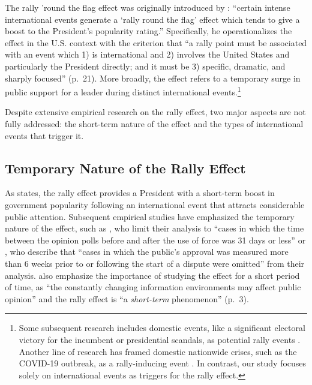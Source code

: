 \documentclass[letterpaper,12pt]{scrartcl}
\begin{document}
The rally 'round the flag effect was originally introduced by \citet[][p.~21]{Mueller1970APSR}: ``certain intense international events generate a `rally round the flag' effect which tends to give a boost to the President's popularity rating.'' Specifically, he operationalizes the effect in the U.S. context with the criterion that ``a rally point must be associated with an event which 1) is international and 2) involves the United States and particularly the President directly; and it must be 3) specific, dramatic, and sharply focused'' (p.~21).  More broadly, the effect refers to a temporary surge in public support for a leader during distinct international events.\footnote{Some subsequent research includes domestic events, like a significant electoral victory for the incumbent or presidential scandals, as potential rally events \citep[e.g.,][]{Newman2010ElectStud}. Another line of research has framed domestic nationwide crises, such as the COVID-19 outbreak, as a rally-inducing event \citep[e.g.,][]{Kritzinger2021WestEurPolit,Yam2020PNAS}. In contrast, our study focuses solely on international events as triggers for the rally effect.}

Despite extensive empirical research on the rally effect, two major aspects are not fully addressed: the short-term nature of the effect and the types of international events that trigger it.


\subsection*{Temporary Nature of the Rally Effect}

As \citet{Mueller1970APSR} states, the rally effect provides a President with a short-term boost in government popularity following an international event that attracts considerable public attention. Subsequent empirical studies have emphasized the temporary nature of the effect, such as \citet[][p.~284]{Lian1993JCR}, who limit their analysis to ``cases in which the time between the opinion polls before and after the use of force was 31 days or less'' or \citet[][p.~670]{Baker2001JCR}, who describe that ``cases in which the public's approval was measured more than 6 weeks prior to or following the start of a dispute were omitted'' from their analysis. \citet{seo2023} also emphasize the importance of studying the effect for a short period of time, as ``the constantly changing information environments may affect public opinion'' and the rally effect is ``a \emph{short-term} phenomenon'' (p.~3).
\end{document}
